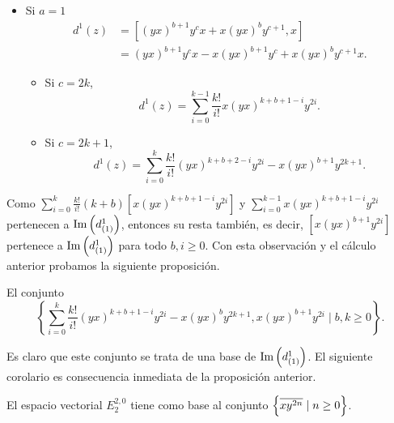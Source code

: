 \documentclass[fleqn,../tesis.tex]{subfiles}
\begin{document}
\begin{itemize}
\begin{itemize}
\begin{itemize}
        \end{itemize}
    \end{itemize}
    \item Si $a = 1$
       \begin{align*}
           d^1(z) &= \left[(yx)^{b + 1}y^cx  + x(yx)^{b}y^{c + 1}, x\right]\\
           &= (yx)^{b + 1}y^{c}x - x(yx)^{b + 1}y^{c} + x(yx)^b y^{c + 1}x.
       \end{align*}
    \begin{itemize}
        \item Si $c = 2k$,
        \[
             d^1(z) = \sum_{i = 0}^{k - 1}\frac{k!}{i!} x(yx)^{k + b + 1 -i}y^{2i}.           
        \]
        \item Si $c = 2k + 1$,
        \[
            d^1(z) = \sum_{i = 0}^{k}\frac{k!}{i!} (yx)^{k  + b + 2 -i}y^{2i} - x(yx)^{b + 1}y^{2k + 1}.
        \]
    \end{itemize}
\end{itemize}
Como $\sum_{i = 0}^{k}\frac{k!}{i!}(k + b)\left[x(yx)^{k +  b + 1 - i}y^{2i}\right]$ y $\sum_{i = 0}^{k - 1}x(yx)^{k + b + 1 -i}y^{2i}$
pertenecen a $\operatorname{Im}\left(d^{1}_{(1)}\right)$, entonces su resta también, es decir, $\left[x(yx)^{b + 1}y^{2i}\right]$ pertenece a $\operatorname{Im}\left(d^{1}_{(1)}\right)$
para todo $b, i \geq 0$. Con esta observación y el cálculo anterior probamos la siguiente proposición.
\begin{prop}
    El conjunto
    \[
        \left\lbrace \sum_{i = 0}^{k}\frac{k!}{i!}(yx)^{k + b + 1 - i}y^{2i} - x(yx)^{b}y^{2k + 1},
            x(yx)^{b + 1}y^{2i} \mid b, k \geq 0 \right\rbrace.    
    \]
\end{prop}
Es claro que este conjunto se trata de una base de $\operatorname{Im}\left(d^{1}_{(1)}\right)$. El siguiente corolario
es consecuencia inmediata de la proposición anterior.
\begin{prop}
    El espacio vectorial $E^{2, 0}_{2}$ tiene como base al conjunto $\left\lbrace \overline{xy^{2n}} \mid n \geq 0\right\rbrace$.
\end{prop}
\end{document}
